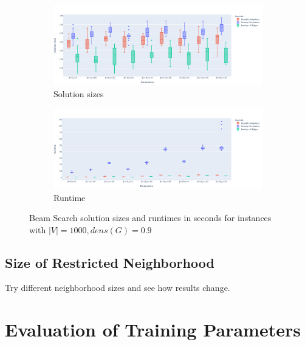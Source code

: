\documentclass[draft,final]{vutinfth} %
\begin{document}
\begin{figure}
    \centering
    \begin{subfigure}{\textwidth}
        \centering
        \includegraphics[width=\textwidth]{graphics/lbh-09-1000-size.pdf}
        \caption{Solution sizes}
    \end{subfigure}
    \begin{subfigure}{\textwidth}
        \centering
        \includegraphics[width=\textwidth]{graphics/lbh-09-1000-runtime.pdf}
        \caption{Runtime}
    \end{subfigure}
    \caption{Beam Search solution sizes and runtimes in seconds for instances with $|V|=1000, dens(G)=0.9$}
    \label{fig:bs-heuristics-random-4}
\end{figure}



\subsection{Size of Restricted Neighborhood}
Try different neighborhood sizes and see how results change.


\section{Evaluation of Training Parameters}\label{sec:train-params}
\end{document}
